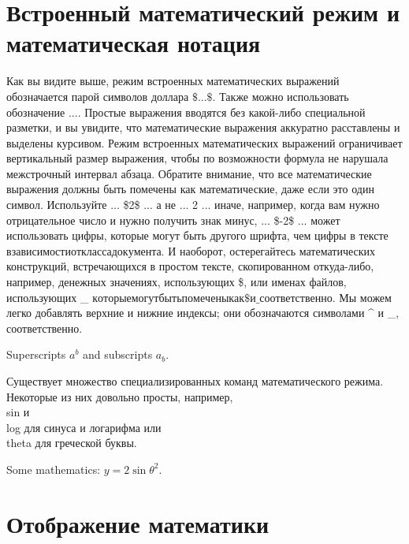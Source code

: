 \documentclass[leqno]{article}
\begin{document}
  \section{Встроенный математический режим и математическая нотация}
  \label{sec:inline}
  
  Как вы видите выше, режим встроенных математических выражений обозначается парой символов доллара \(\$...\$\). Также можно использовать обозначение \( ... \). Простые выражения вводятся без какой-либо специальной разметки, и вы увидите, что математические выражения аккуратно расставлены и выделены курсивом.
  Режим встроенных математических выражений ограничивает вертикальный размер выражения, чтобы по возможности формула не нарушала межстрочный интервал абзаца.
  Обратите внимание, что все математические выражения должны быть помечены как математические, даже если это один символ.
  Используйте ... \$2\$ ... а не ... 2 ... иначе, например, когда вам нужно отрицательное число и нужно получить знак минус, ... \$-2\$ ...
  может использовать цифры, которые могут быть другого шрифта, чем цифры в тексте \(в зависимости от класса документа\). И наоборот, остерегайтесь математических конструкций, встречающихся в
  простом тексте, скопированном откуда-либо, например, денежных значениях, использующих \$, или именах файлов,
  использующих \_ \(которые могут быть помечены как \$ и \_ соответственно\).
  Мы можем легко добавлять верхние и нижние индексы; они обозначаются символами \textasciicircum{} и \_,
  соответственно.

  \begin{center}
    Superscripts $a^{b}$ and subscripts $a_{b}$.
  \end{center}


  Существует множество специализированных команд математического режима. Некоторые из них довольно просты,
  например, \\sin и \\log для синуса и логарифма или \\theta для греческой буквы.

  \begin{center}
  Some mathematics: $y = 2 \sin \theta^{2}$.
  \end{center}
  

  \section{Отображение математики}
  \label{sec:display}
  
\end{document}
